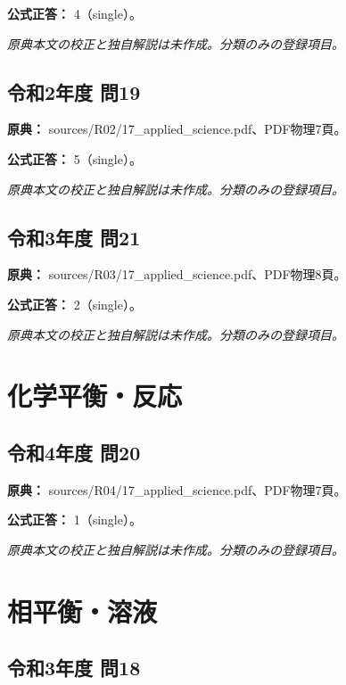 \textbf{公式正答：} 4（single）。

\par\textit{原典本文の校正と独自解説は未作成。分類のみの登録項目。}

\subsection{令和2年度 問19}
\label{q:r02-reg-applied-19}

\noindent\textbf{原典：} sources/R02/17\_applied\_science.pdf、PDF物理7頁。

\textbf{公式正答：} 5（single）。

\par\textit{原典本文の校正と独自解説は未作成。分類のみの登録項目。}

\subsection{令和3年度 問21}
\label{q:r03-reg-applied-21}

\noindent\textbf{原典：} sources/R03/17\_applied\_science.pdf、PDF物理8頁。

\textbf{公式正答：} 2（single）。

\par\textit{原典本文の校正と独自解説は未作成。分類のみの登録項目。}

\section{化学平衡・反応}

\subsection{令和4年度 問20}
\label{q:r04-reg-applied-20}

\noindent\textbf{原典：} sources/R04/17\_applied\_science.pdf、PDF物理7頁。

\textbf{公式正答：} 1（single）。

\par\textit{原典本文の校正と独自解説は未作成。分類のみの登録項目。}

\section{相平衡・溶液}

\subsection{令和3年度 問18}
\label{q:r03-reg-applied-18}

